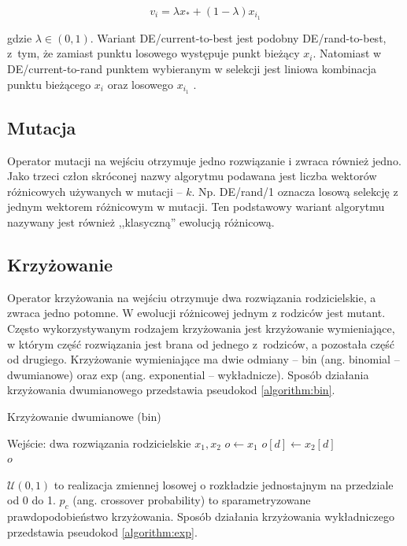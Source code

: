 \documentclass[a4paper,onecolumn,oneside,12pt,wide,floatssmall]{mwrep}
\theoremstyle{definition}
\theoremstyle{plain}%
\theoremstyle{remark}
\begin{document}
$$ v_i = \lambda x_* + (1 - \lambda)x_{i_1} $$

gdzie $\lambda \in (0, 1)$. Wariant DE/current-to-best jest podobny DE/rand-to-best, z~tym, że zamiast punktu
losowego występuje punkt bieżący $x_i$.
Natomiast w DE/current-to-rand punktem wybieranym w selekcji jest liniowa kombinacja 
punktu bieżącego $x_i$ oraz losowego $x_{i_1}$ \cite{zaharie}.

\subsection{Mutacja}

Operator mutacji na wejściu otrzymuje jedno rozwiązanie i zwraca również jedno.
Jako trzeci człon skróconej nazwy algorytmu
podawana jest liczba wektorów różnicowych używanych w mutacji -- $k$.
Np. DE/rand/1 oznacza losową selekcję z jednym wektorem różnicowym w mutacji.
Ten podstawowy wariant algorytmu nazywany jest również ,,klasyczną'' ewolucją różnicową. 

\subsection{Krzyżowanie}
\label{sec:krzyzowanie}

Operator krzyżowania na wejściu otrzymuje dwa rozwiązania rodzicielskie, a zwraca jedno potomne. 
W ewolucji różnicowej jednym z rodziców jest mutant. 
Często wykorzystywanym rodzajem krzyżowania jest krzyżowanie wymieniające, w którym 
część rozwiązania jest brana od jednego z rodziców, a pozostała część od drugiego. 
Krzyżowanie wymieniające ma dwie odmiany -- bin (ang. binomial -- dwumianowe) oraz 
exp (ang. exponential -- wykładnicze). 
Sposób działania krzyżowania dwumianowego przedstawia pseudokod \ref{algorithm:bin}.

\begin{algorithm}[H]
\caption{Krzyżowanie dwumianowe (bin)}
\label{algorithm:bin}
\begin{algorithmic}[1]
\State Wejście: dwa rozwiązania rodzicielskie $x_1, x_2$ 
\State $o \gets x_1$
    \State $o[d] \gets x_2[d]$     
  \EndIf 
\EndFor \\
\Return $o$
\end{algorithmic}
\end{algorithm}

$\mathcal{U}(0, 1)$ to realizacja zmiennej losowej o rozkładzie jednostajnym na przedziale od 0 do 1.
$p_c$ (ang. crossover probability) to sparametryzowane prawdopodobieństwo krzyżowania. 
Sposób działania krzyżowania wykładniczego przedstawia pseudokod \ref{algorithm:exp}.
\end{document}
